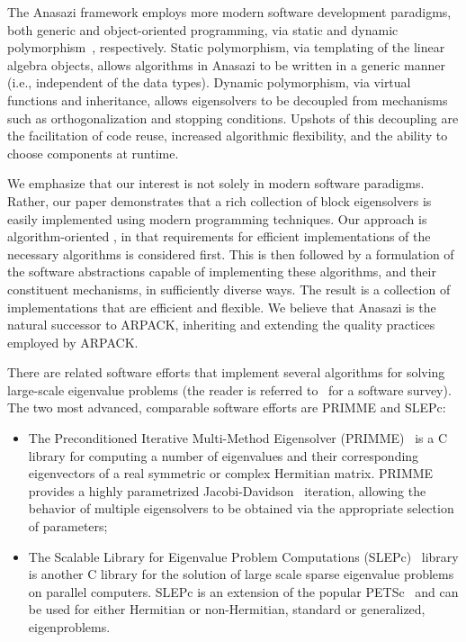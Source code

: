 \documentclass[acmtoms]{acmtrans2m}
\newcounter{algorithm}
\begin{document}
The Anasazi framework employs more modern software development paradigms, both generic and
object-oriented programming, via static and dynamic polymorphism~\cite[Chapter 14]{VJ02}, respectively. 
Static polymorphism, via templating of the linear algebra objects, allows algorithms in Anasazi
to be written in a generic manner (i.e., independent of the data types). Dynamic
polymorphism, via virtual functions and inheritance, allows eigensolvers to be decoupled
from mechanisms such as orthogonalization and stopping conditions. Upshots of this
decoupling are the facilitation of code reuse, increased algorithmic flexibility, and the
ability to choose components at runtime.

We emphasize that our interest is not solely in modern software paradigms. Rather, our
paper demonstrates that a rich collection of block eigensolvers is easily implemented
using modern programming techniques. Our approach is algorithm-oriented \cite{muov:94}, in
that requirements for efficient implementations of the necessary algorithms is considered
first. This is then followed by a formulation of the software abstractions capable of
implementing these algorithms, and their constituent mechanisms, in sufficiently diverse
ways. The result is a collection of implementations that are efficient and flexible. We
believe that Anasazi is the natural successor to ARPACK, inheriting and extending the
quality practices employed by ARPACK.

There are related software efforts that implement several algorithms for solving
large-scale eigenvalue problems (the reader is referred to~\cite{slepc:05}
for a software survey).  The two most advanced, comparable software efforts are PRIMME and
SLEPc:
\begin{itemize}
\item
The Preconditioned Iterative Multi-Method Eigensolver (PRIMME)~\cite{primme:06} is a C
library for computing a number of eigenvalues and their corresponding eigenvectors of a real
symmetric or complex Hermitian matrix. PRIMME provides a highly parametrized
Jacobi-Davidson~\cite{slvo:96} iteration, allowing the behavior of multiple eigensolvers
to be obtained via the appropriate selection of parameters;
\item
The Scalable Library for Eigenvalue Problem Computations (SLEPc)~\cite{slepc:06} library
is another C library for the solution of large scale sparse eigenvalue problems on parallel
computers. SLEPc is an extension of the popular PETSc~\cite{petsc-web-page} and can be
used for either Hermitian or non-Hermitian, standard or generalized, eigenproblems.
\end{itemize}
\end{document}
